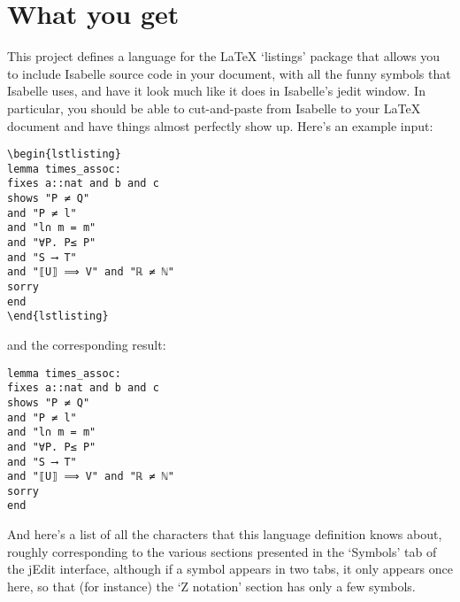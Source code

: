 \documentclass[11pt,notitlepage,openany,oneside]{book}
\begin{document}
\chapter{What you get}
This project defines a language for the LaTeX `listings' package that allows 
you to include Isabelle source code in your document, with all the funny symbols
that Isabelle uses, and have it look much like it does in Isabelle's jedit window.
In particular, you should be able to cut-and-paste from Isabelle to your LaTeX
document and have things almost perfectly show up. Here's an example input:

\begin{verbatim}
\begin{lstlisting}
lemma times_assoc:
fixes a::nat and b and c
shows "P ≠ Q"
and "P ≠ l"
and "l∩ m = m"
and "∀P. P≤ P"
and "S ⟶ T"
and "⟦U⟧ ⟹ V" and "ℝ ≠ ℕ"
sorry
end
\end{lstlisting}
\end{verbatim}
\noindent
and the corresponding result:

\lstset{language=Isabelle,basicstyle=\ttfamily}
\begin{lstlisting}
lemma times_assoc:
fixes a::nat and b and c
shows "P ≠ Q"
and "P ≠ l"
and "l∩ m = m"
and "∀P. P≤ P"
and "S ⟶ T"
and "⟦U⟧ ⟹ V" and "ℝ ≠ ℕ"
sorry
end
\end{lstlisting}

And here's a list of all the characters that this language definition knows about, 
roughly corresponding to the various sections presented in the `Symbols' tab of
the jEdit interface, although if a symbol appears in two tabs, it only appears
once here, so that (for instance) the `Z notation' section has only a few symbols. 
\end{document}
